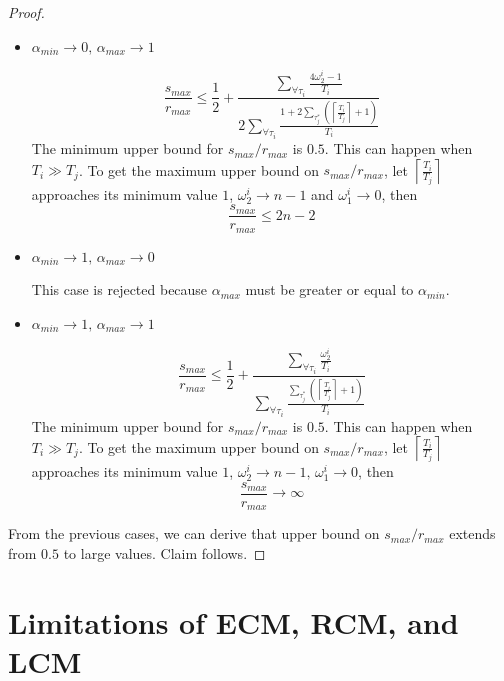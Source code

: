 \documentclass[a4paper,english]{article}
\newtheorem{proof}{Proof}
\begin{document}
\begin{proof}
\begin{itemize}
\item $\alpha_{min}\rightarrow0,\,\alpha_{max}\rightarrow1$


\begin{equation}
\frac{s_{max}}{r_{max}}\le\frac{1}{2}+\frac{\sum_{\forall\tau_{i}}\frac{4\omega_{2}^{i}-1}{T_{i}}}{2\sum_{\forall\tau_{i}}\frac{1+2\sum_{\tau_{j}^{*}}\left(\left\lceil \frac{T_{i}}{T_{j}}\right\rceil +1\right)}{T_{i}}}\label{eq:lcm rma lock-free comparison 4}
\end{equation}
The minimum upper bound for $s_{max}/r_{max}$ is $0.5$. This can
happen when $T_{i}\gg T_{j}$. To get the maximum upper bound on $s_{max}/r_{max}$,
let $\left\lceil \frac{T_{i}}{T_{j}}\right\rceil $ approaches its
minimum value $1$, $\omega_{2}^{i}\rightarrow n-1$ and $\omega_{1}^{i}\rightarrow0$,
then 
\[
\frac{s_{max}}{r_{max}}\le2n-2
\]


\item $\alpha_{min}\rightarrow1,\,\alpha_{max}\rightarrow0$


This case is rejected because $\alpha_{max}$ must be greater or equal
to $\alpha_{min}$.

\item $\alpha_{min}\rightarrow1,\,\alpha_{max}\rightarrow1$


\begin{equation}
\frac{s_{max}}{r_{max}}\le\frac{1}{2}+\frac{\sum_{\forall\tau_{i}}\frac{\omega_{2}^{i}}{T_{i}}}{\sum_{\forall\tau_{i}}\frac{\sum_{\tau_{j}^{*}}\left(\left\lceil \frac{T_{i}}{T_{j}}\right\rceil +1\right)}{T_{i}}}\label{eq:lcm rma lock-free comparison 5}
\end{equation}
The minimum upper bound for $s_{max}/r_{max}$ is $0.5$. This can
happen when $T_{i}\gg T_{j}$. To get the maximum upper bound on $s_{max}/r_{max}$,
let $\left\lceil \frac{T_{i}}{T_{j}}\right\rceil $ approaches its
minimum value $1$, $\omega_{2}^{i}\rightarrow n-1,\,\omega_{1}^{i}\rightarrow0$,
then 
\[
\frac{s_{max}}{r_{max}}\rightarrow\infty
\]


\end{itemize}
From the previous cases, we can derive that upper bound on $s_{max}/r_{max}$
extends from $0.5$ to large values. Claim follows.

\end{proof}

\section{Limitations of ECM, RCM, and LCM}\label{probelm description}
\end{document}

